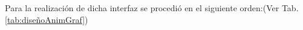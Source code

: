 Para la realización de dicha interfaz se procedió en el siguiente orden:(Ver 
Tab.\ref{tab:diseñoAnimGraf})
%     
